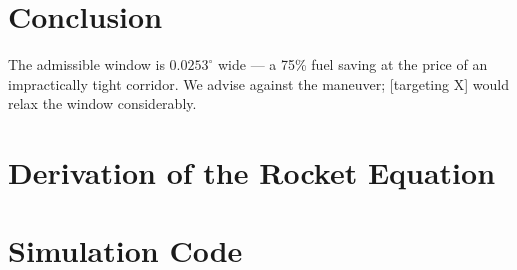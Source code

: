 \documentclass[final,3p,times,onecolumn]{elsarticle}
\begin{document}
\section{Conclusion}
The admissible window is $0.0253^\circ$ wide --- a 75\% fuel saving at the
price of an impractically tight corridor. We advise against the maneuver;
[targeting X] would relax the window considerably.

\appendix
\section{Derivation of the Rocket Equation}
\section{Simulation Code}



\end{document}
